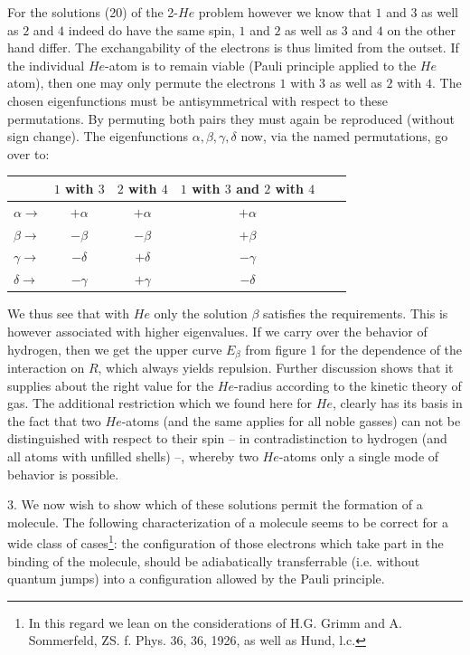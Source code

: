 \documentclass{article}
\begin{document}
For the solutions (20) of the 2-$He$ problem however we know that $1$ and $3$ as well as $2$ and $4$ indeed do have the same spin, $1$ and $2$ as well as $3$ and $4$ on the other hand differ. The exchangability of the electrons is thus limited from the outset. If the individual $He$-atom is to remain viable (Pauli principle applied to the $He$ atom), then one may only permute the electrons $1$ with $3$ as well as $2$ with $4$. The chosen eigenfunctions must be antisymmetrical with respect to these permutations. By permuting both pairs they must again be reproduced (without sign change). The eigenfunctions $\alpha,\beta,\gamma,\delta$ now, via the named permutations, go over to: 
\begin{tabular}{l|c|c|c|c|l}
  \, & $1$ with $3$ & $2$ with $4$ & $1$ with $3$ and $2$ with $4$ \\
\hline
$\alpha \to$ & $+\alpha$ & $+\alpha$   & $+\alpha$  \\
$\beta \to$  & $-\beta$  & $-\beta$    & $+\beta$ \\
$\gamma \to$ & $-\delta$ & $+\delta$   & $-\gamma$ \\
$\delta \to$ & $-\gamma$ & $+\gamma$   & $-\delta$
\end{tabular}

We thus see that with $He$ only the solution $\beta$ satisfies the requirements. This is however associated with higher eigenvalues. If we carry over the behavior of hydrogen, then we get the upper curve $E_\beta$ from figure 1 for the dependence of the interaction on $R$, which always yields repulsion. Further discussion shows that it supplies about the right value for the $He$-radius according to the kinetic theory of gas. The additional restriction which we found here for $He$, clearly has its basis in the fact that two $He$-atoms (and the same applies for all noble gasses) can not be distinguished with respect to their spin -- in contradistinction to hydrogen (and all atoms with unfilled shells) --, whereby two $He$-atoms only a single mode of behavior is possible.

3. We now wish to show which of these  solutions permit the formation of a molecule. The following characterization of a molecule seems to be correct for a wide class of cases\footnote{In this regard we lean on the considerations of H.G. Grimm and A. Sommerfeld, ZS. f. Phys. 36, 36, 1926, as well as Hund, l.c.}: the configuration of those electrons which take part in the binding of the molecule, should be adiabatically transferrable (i.e. without quantum jumps) into a configuration allowed by the Pauli principle.
\end{document}
